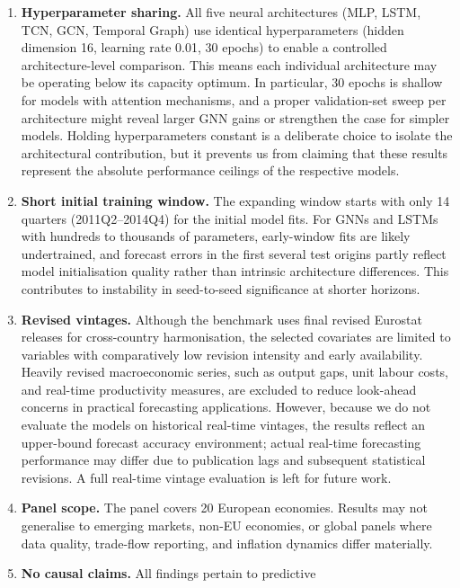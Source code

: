 \documentclass[
]{article}
\begin{document}
\begin{enumerate}
\def\labelenumi{\arabic{enumi}.}
\item
  \textbf{Hyperparameter sharing.} All five neural architectures (MLP,
  LSTM, TCN, GCN, Temporal Graph) use identical hyperparameters (hidden
  dimension 16, learning rate 0.01, 30 epochs) to enable a controlled
  architecture-level comparison. This means each individual architecture
  may be operating below its capacity optimum. In particular, 30 epochs
  is shallow for models with attention mechanisms, and a proper
  validation-set sweep per architecture might reveal larger GNN gains or
  strengthen the case for simpler models. Holding hyperparameters constant is
  a deliberate choice to isolate the architectural contribution, but it prevents
  us from claiming that these results represent the absolute performance ceilings
  of the respective models.
\item
  \textbf{Short initial training window.} The expanding window starts
  with only 14 quarters (2011Q2--2014Q4) for the initial model fits. For
  GNNs and LSTMs with hundreds to thousands of parameters, early-window
  fits are likely undertrained, and forecast errors in the first several
  test origins partly reflect model initialisation quality rather than
  intrinsic architecture differences. This contributes to instability in
  seed-to-seed significance at shorter horizons.
\item
  \textbf{Revised vintages.} Although the benchmark uses final revised Eurostat releases for cross-country harmonisation, the selected covariates are limited to variables with comparatively low revision intensity and early availability. Heavily revised macroeconomic series, such as output gaps, unit labour costs, and real-time productivity measures, are excluded to reduce look-ahead concerns in practical forecasting applications. However, because we do not evaluate the models on historical real-time vintages, the results reflect an upper-bound forecast accuracy environment; actual real-time forecasting performance may differ due to publication lags and subsequent statistical revisions. A full real-time vintage evaluation is left for future work.
\item
  \textbf{Panel scope.} The panel covers 20 European economies. Results
  may not generalise to emerging markets, non-EU economies, or global
  panels where data quality, trade-flow reporting, and inflation
  dynamics differ materially.
\item
  \textbf{No causal claims.} All findings pertain to predictive

\end{enumerate}
\end{document}
